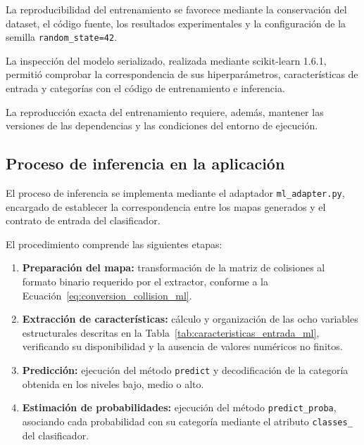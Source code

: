 La reproducibilidad del entrenamiento se favorece mediante la conservación del dataset, el código fuente, los resultados experimentales y la configuración de la semilla \texttt{random\_state=42}.

La inspección del modelo serializado, realizada mediante scikit-learn 1.6.1, permitió comprobar la correspondencia de sus hiperparámetros, características de entrada y categorías con el código de entrenamiento e inferencia.

La reproducción exacta del entrenamiento requiere, además, mantener las versiones de las dependencias y las condiciones del entorno de ejecución.


\subsection{Proceso de inferencia en la aplicación}
\label{subsec:proceso_inferencia_aplicacion}

El proceso de inferencia se implementa mediante el adaptador \texttt{ml\_adapter.py}, encargado de establecer la correspondencia entre los mapas generados y el contrato de entrada del clasificador.

El procedimiento comprende las siguientes etapas:

\begin{enumerate}
	
	\item \textbf{Preparación del mapa:}
	transformación de la matriz de colisiones al formato binario requerido por el extractor, conforme a la Ecuación~\ref{eq:conversion_collision_ml}.
	
	\item \textbf{Extracción de características:}
	cálculo y organización de las ocho variables estructurales descritas en la Tabla~\ref{tab:caracteristicas_entrada_ml}, verificando su disponibilidad y la ausencia de valores numéricos no finitos.
	
	\item \textbf{Predicción:}
	ejecución del método \texttt{predict} y decodificación de la categoría obtenida	en los niveles bajo, medio o alto.
	
	\item \textbf{Estimación de probabilidades:}
	ejecución del método \texttt{predict\_proba}, asociando cada probabilidad con su categoría	mediante el atributo \texttt{classes\_}	del clasificador.
	
\end{enumerate}

